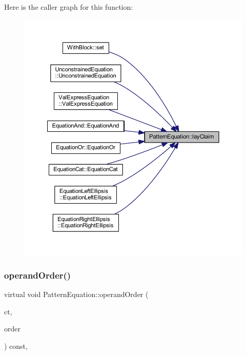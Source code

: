 Here is the caller graph for this function\+:
\nopagebreak
\begin{figure}[H]
\begin{center}
\leavevmode
\includegraphics[width=350pt]{class_pattern_equation_a1c5807ba6c66f6c089d9fcc39140f187_icgraph}
\end{center}
\end{figure}
\mbox{\label{class_pattern_equation_a944d7114e5d5b6876352e555cc060829}} 
\subsubsection{\texorpdfstring{operandOrder()}{operandOrder()}}
{\footnotesize\ttfamily virtual void Pattern\+Equation\+::operand\+Order (\begin{DoxyParamCaption}\item[{\mbox{\hyperlink{class_constructor}{Constructor}} $\ast$}]{ct,  }\item[{vector$<$ \mbox{\hyperlink{class_operand_symbol}{Operand\+Symbol}} $\ast$ $>$ \&}]{order }\end{DoxyParamCaption}) const\hspace{0.3cm}{\ttfamily [inline]}, {\ttfamily [virtual]}}




